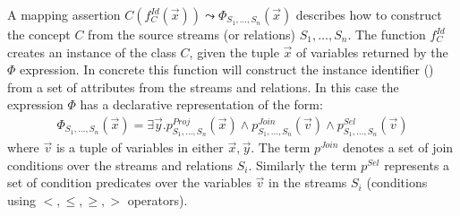 A mapping assertion $C(f_C^{Id}(\vec{x})) \leadsto \Phi_{S_1,\ldots,S_n}(\vec{x})$ describes how to construct the concept $C$ from the source streams (or relations) $S_1,\ldots,S_n$. 
The function $f_C^{Id}$ creates an instance of the class $C$, given the tuple $\vec{x}$ of variables returned by the $\Phi$ expression. 
In concrete this function will construct the instance identifier (\uri) from a set of attributes from the streams and relations.
In this case the expression $\Phi$ has a declarative representation of the form:
\begin{align*}
\Phi_{S_1,\ldots,S_n}(\vec{x})=\exists\vec{y}.p^{Proj}_{S_1,\ldots,S_n}(\vec{x}) \wedge p^{Join}_{S_1,\ldots,S_n}(\vec{v}) \wedge p_{S_1,\ldots,S_n}^{Sel}(\vec{v})
\end{align*}
where $\vec{v}$ is a tuple of variables in either $\vec{x},\vec{y}$. 
The term $p^{Join}$ denotes a set of join conditions over the streams and relations $S_i$. 
Similarly the term $p^{Sel}$ represents a set of condition predicates over the variables $\vec{v}$ in the streams $S_i$ (\eg conditions using $<,\leq,\geq,>$ operators).
\\
%

